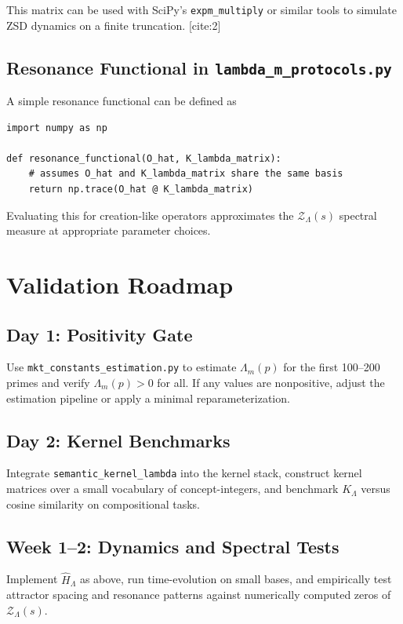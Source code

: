 \documentclass[11pt]{article}
\begin{document}
This matrix can be used with SciPy's \texttt{expm\_multiply} or
similar tools to simulate ZSD dynamics on a finite truncation.
[cite:2]

\subsection{Resonance Functional in \texttt{lambda\_m\_protocols.py}}

A simple resonance functional can be defined as

\begin{verbatim}
import numpy as np

def resonance_functional(O_hat, K_lambda_matrix):
    # assumes O_hat and K_lambda_matrix share the same basis
    return np.trace(O_hat @ K_lambda_matrix)
\end{verbatim}

Evaluating this for creation-like operators approximates the
$\mathcal{Z}_{\Lambda}(s)$ spectral measure at appropriate parameter
choices.

\section{Validation Roadmap}

\subsection{Day 1: Positivity Gate}

Use \texttt{mkt\_constants\_estimation.py} to estimate
$\Lambda_m(p)$ for the first 100--200 primes and verify
$\Lambda_m(p) > 0$ for all. If any values are nonpositive, adjust
the estimation pipeline or apply a minimal reparameterization.

\subsection{Day 2: Kernel Benchmarks}

Integrate \texttt{semantic\_kernel\_lambda} into the kernel stack,
construct kernel matrices over a small vocabulary of concept-integers,
and benchmark $K_{\Lambda}$ versus cosine similarity on compositional
tasks.

\subsection{Week 1--2: Dynamics and Spectral Tests}

Implement $\hat{H}_{\Lambda}$ as above, run time-evolution on small
bases, and empirically test attractor spacing and resonance patterns
against numerically computed zeros of $\mathcal{Z}_{\Lambda}(s)$.
\end{document}

